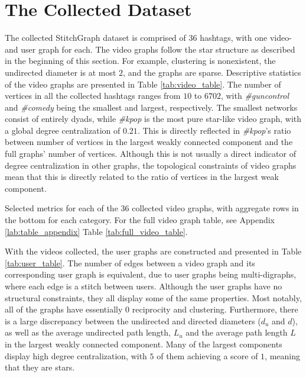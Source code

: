 \section{The Collected Dataset}
The collected StitchGraph dataset is comprised of $36$ hashtags, with one video- and user graph for each. The video graphs follow the star structure as described in the beginning of this section. For example, clustering is nonexistent, the undirected diameter is at most $2$, and the graphs are sparse. Descriptive statistics of the video graphs are presented in Table \ref{tab:video_table}. The number of vertices in all the collected hashtags ranges from $10$ to $6702$, with \textit{\#guncontrol} and \textit{\#comedy} being the smallest and largest, respectively. The smallest networks consist of entirely dyads, while \textit{\#kpop} is the most pure star-like video graph, with a global degree centralization \citep{centrality} of $0.21$. This is directly reflected in \textit{\#kpop}'s ratio between number of vertices in the largest weakly connected component and the full graphs' number of vertices. Although this is not usually a direct indicator of degree centralization in other graphs, the topological constraints of video graphs mean that this is directly related to the ratio of vertices in the largest weak component. 

\begin{table}[H]
    \centering
    \begin{adjustwidth}{-\textwidth}{-\textwidth}
    \centering
    
    \end{adjustwidth}
    \caption{Selected metrics for each of the $36$ collected video graphs, with aggregate rows in the bottom for each category. For the full video graph table, see Appendix \ref{lab:table_appendix} Table \ref{tab:full_video_table}.}
    \label{tab:video_table}
\end{table}


With the videos collected, the user graphs are constructed and presented in Table \ref{tab:user_table}. The number of edges between a video graph and its corresponding user graph is equivalent, due to user graphs being multi-digraphs, where each edge is a stitch between users. Although the user graphs have no structural constraints, they all display some of the same properties. Most notably, all of the graphs have essentially $0$ reciprocity and clustering. Furthermore, there is a large discrepancy between the undirected and directed diameters ($d_u$ and $d$), as well as the average undirected path length, $L_u$ and the average path length $L$ in the largest weakly connected component. Many of the largest components display high degree centralization, with $5$ of them achieving a score of $1$, meaning that they are stars. 



